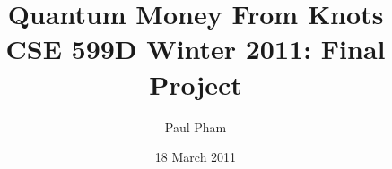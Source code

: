 \documentclass[twocolumn,10pt]{article}
\title{Quantum Money From Knots\\
\large{CSE 599D Winter 2011: Final Project}
}
\date{18 March 2011}
\author{Paul Pham}
\theoremstyle{plain}
\begin{document}
\newcommand{\ket}[1]{|#1 \rangle}
\newcommand{\bra}[1]{\langle #1 |}
\newcommand{\braket}[2]{\langle #1|#2 \rangle}
\newcommand{\normtwo}{\frac{1}{\sqrt{2}}}
\newcommand{\norm}[1]{\parallel #1 \parallel}
\newcommand{\Dhalf}{\tfrac{D}{2}}
\newcommand{\threeDhalf}{\tfrac{3D}{2}}
\newcommand{\cutoffInterval}{\overline{\left[\Dhalf, \threeDhalf\right]}}
\newcommand{\cutoffG}{\mathcal{G}_p(\cutoffInterval)}

\maketitle





















\end{document}

